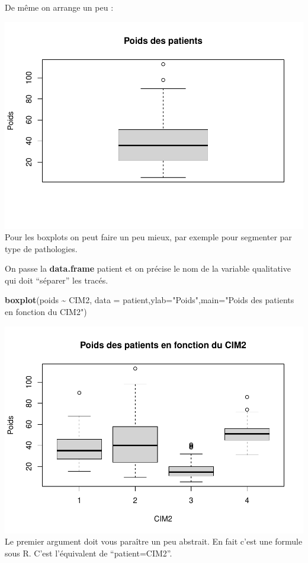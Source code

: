 \documentclass[
]{book}
\newenvironment{Shaded}{\begin{snugshade}}{\end{snugshade}}
\newcommand{\AttributeTok}[1]{\textcolor[rgb]{0.13,0.29,0.53}{#1}}
\newcommand{\FunctionTok}[1]{\textcolor[rgb]{0.13,0.29,0.53}{\textbf{#1}}}
\newcommand{\NormalTok}[1]{#1}
\newcommand{\SpecialCharTok}[1]{\textcolor[rgb]{0.81,0.36,0.00}{\textbf{#1}}}
\newcommand{\StringTok}[1]{\textcolor[rgb]{0.31,0.60,0.02}{#1}}
\begin{document}
De même on arrange un peu :

\begin{Shaded}
\end{Shaded}

\includegraphics{_main_files/figure-latex/poids5-1.pdf}
Pour les boxplots on peut faire un peu mieux, par exemple pour segmenter par type
de pathologies.

On passe la \textbf{data.frame} patient et on précise le nom de la variable qualitative
qui doit ``séparer'' les tracés.

\begin{Shaded}
\begin{Highlighting}[]
\FunctionTok{boxplot}\NormalTok{(poids }\SpecialCharTok{\textasciitilde{}}\NormalTok{ CIM2, }\AttributeTok{data =}\NormalTok{ patient,}\AttributeTok{ylab=}\StringTok{"Poids"}\NormalTok{,}\AttributeTok{main=}\StringTok{"Poids des patients en fonction du CIM2"}\NormalTok{) }
\end{Highlighting}
\end{Shaded}

\includegraphics{_main_files/figure-latex/poids6-1.pdf}
Le premier argument doit vous paraître un peu abstrait. En fait c'est une formule
sous R. C'est l'équivalent de ``patient=CIM2''.
\end{document}
